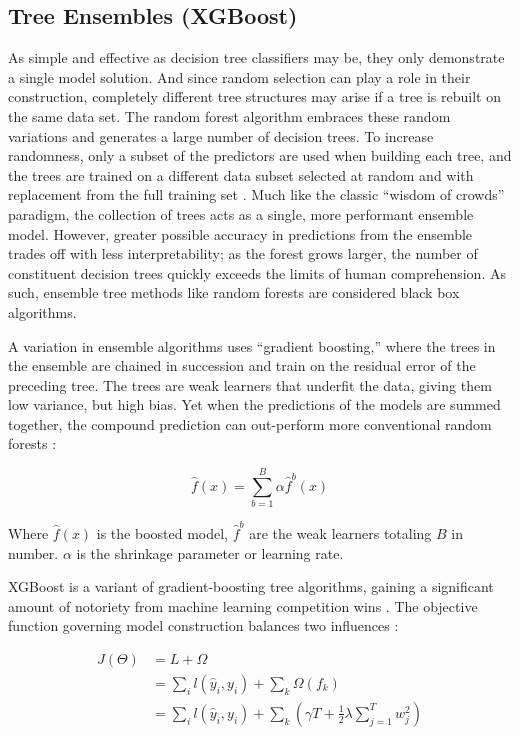 \subsection{Tree Ensembles (XGBoost)}

As simple and effective as decision tree classifiers may be, they only demonstrate a single model solution. And since random selection can play a role in their construction, completely different tree structures may arise if a tree is rebuilt on the same data set. The random forest algorithm embraces these random variations and generates a large number of decision trees. To increase randomness, only a subset of the predictors are used when building each tree, and the trees are trained on a different data subset selected at random and with replacement from the full training set \citep[p. 376--377]{bertsimas_analytics_2016}. Much like the classic “wisdom of crowds” paradigm, the collection of trees acts as a single, more performant ensemble model. However, greater possible accuracy in predictions from the ensemble trades off with less interpretability; as the forest grows larger, the number of constituent decision trees quickly exceeds the limits of human comprehension. As such, ensemble tree methods like random forests are considered black box algorithms.

A variation in ensemble algorithms uses “gradient boosting,” where the trees in the ensemble are chained in succession and train on the residual error of the preceding tree. The trees are weak learners that underfit the data, giving them low variance, but high bias. Yet when the predictions of the models are summed together, the compound prediction can out-perform more conventional random forests \citep[p. 323]{james_introduction_2013}:

\begin{equation}
\label{eq:xgb_form}
    \hat{f}(x) = \sum_{b=1}^{B}{\alpha \hat{f}^{b}(x)}
\end{equation}

Where $\hat{f}(x)$ is the boosted model, $\hat{f}^b$ are the weak learners totaling $B$ in number. $\alpha$ is the shrinkage parameter or learning rate. 

XGBoost is a variant of gradient-boosting tree algorithms, gaining a significant amount of notoriety from machine learning competition wins \citep{chen_dmlcxgboost_2021}. The objective function governing model construction balances two influences \citep{chen_xgboost_2016}:

\begin{equation}
\label{eq:xgb_objective}
\begin{aligned}
    J(\Theta) &= L + \Omega \\
    &= \sum_{i}{l(\hat{y}_i,y_i)}+\sum_{k}{\Omega(f_k)} \\
    &= \sum_{i}{l(\hat{y}_i,y_i)}+\sum_{k}{\left({\gamma T}+\frac{1}{2} \lambda \sum_{j=1}^T{w_j^2}\right)}
\end{aligned}
\end{equation}

